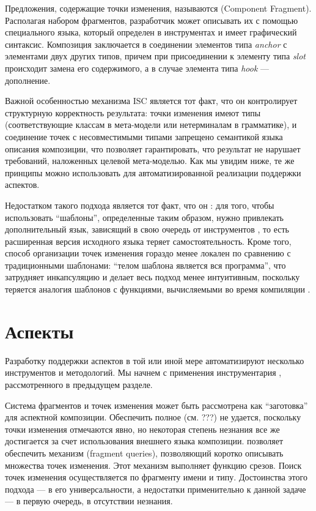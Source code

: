 Предложения, содержащие точки изменения, называются  (Component Fragment). Располагая набором фрагментов, разработчик может описывать их  с помощью специального языка, который определен в инструментах  и имеет графический синтаксис. Композиция заключается в соединении элементов типа \emph{anchor} с элементами двух других типов, причем при присоединении к элементу типа \emph{slot} происходит замена его содержимого, а в случае элемента типа \emph{hook} --- дополнение.

Важной особенностью механизма ISC является тот факт, что он контролирует структурную корректность результата: точки изменения имеют типы (соответствующие классам в мета-модели или нетерминалам в грамматике), и соединение точек с несовместимыми типами запрещено семантикой языка описания композиции, что позволяет гарантировать, что результат не нарушает требований, наложенных целевой мета-моделью. Как мы увидим ниже, те же принципы можно использовать для автоматизированной реализации поддержки аспектов.

Недостатком такого подхода является тот факт, что он : для того, чтобы использовать ``шаблоны'', определенные таким образом, нужно привлекать дополнительный язык, зависящий в свою очередь от инструментов , то есть расширенная версия исходного языка теряет самостоятельность. Кроме того, способ организации точек изменения гораздо менее локален по сравнению с традиционными шаблонами: ``телом шаблона является вся программа'', что затрудняет инкапсуляцию и делает весь подход менее интуитивным, поскольку теряется аналогия шаблонов с функциями, вычисляемыми во время компиляции \cite{???}.

\section{Аспекты}

Разработку поддержки аспектов в той или иной мере автоматизируют несколько инструментов и методологий. Мы начнем с применения инструментария , рассмотренного в предыдущем разделе.

Система фрагментов и точек изменения может быть рассмотрена как ``заготовка'' для аспектной композиции. Обеспечить полное  (см. ???) не удается, поскольку точки изменения отмечаются явно, но некоторая степень незнания все же достигается за счет использования внешнего языка композиции.  позволяет обеспечить механизм  (fragment queries), позволяющий коротко описывать множества точек изменения. Этот механизм выполняет функцию срезов. Поиск точек изменения осуществляется по фрагменту имени и типу.  Достоинства этого подхода --- в его универсальности, а недостатки применительно к данной задаче --- в первую очередь, в отсутствии незнания.

